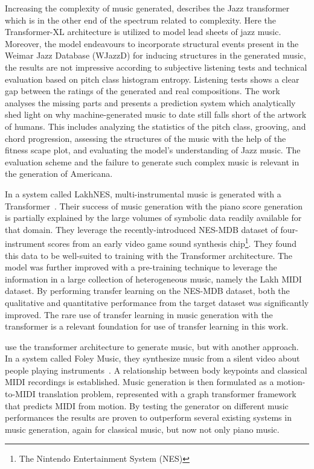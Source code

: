\documentclass{IEEEtran}
\begin{document}
Increasing the complexity of music generated, \citeauthor{wu2020jazz} describes the Jazz transformer which is in
the other end of the spectrum related to complexity. Here the
Transformer-XL architecture is utilized to model lead sheets of jazz music.
Moreover, the model endeavours to incorporate structural events present in the
Weimar Jazz Database (WJazzD) for inducing structures in the generated music, 
the results are not impressive according to subjective listening tests and technical 
evaluation based on pitch class histogram entropy.
Listening tests shows a clear gap between the ratings of the generated and
real compositions. The work analyses the missing parts and presents a
prediction system which analytically shed light on why
machine-generated music to date still falls short of the artwork of humans.
This includes analyzing the statistics of the pitch class, grooving, and
chord progression, assessing the structures of the music with the help of
the fitness scape plot, and evaluating the model’s understanding of Jazz
music. The evaluation scheme and the failure to generate such complex music
is relevant in the generation of Americana.

In a system called LakhNES,
multi-instrumental music is generated with a Transformer~\cite{donahue2019lakhnes}.
Their success of music generation with the piano score generation is
partially explained by the large volumes of symbolic data readily available
for that domain. They leverage the recently-introduced NES-MDB dataset of
four-instrument scores from an early video game sound synthesis
chip\footnote{The Nintendo Entertainment System (NES)}. They found this data
to be well-suited to training with the Transformer architecture. The model
was further improved with a pre-training technique to leverage the
information in a large collection of heterogeneous music, namely the Lakh
MIDI dataset. By performing transfer learning on the NES-MDB dataset, both
the qualitative and quantitative performance from the target dataset was
significantly improved. The rare use of transfer learning in music generation
with the transformer is a relevant foundation for use of transfer learning in
this work.

\citeauthor{gan2020foley} use the transformer architecture to generate music,
but with another approach. In a system called Foley Music, they synthesize
music from a silent video about people playing
instruments~\cite{gan2020foley}. A relationship between body keypoints and
classical MIDI recordings is established. Music generation is then formulated
as a motion-to-MIDI translation problem, represented with a graph transformer
framework that predicts MIDI from motion. By testing the generator on
different music performances the results are proven to outperform several
existing systems in music generation, again for classical music, but now not only piano music.
\end{document}
